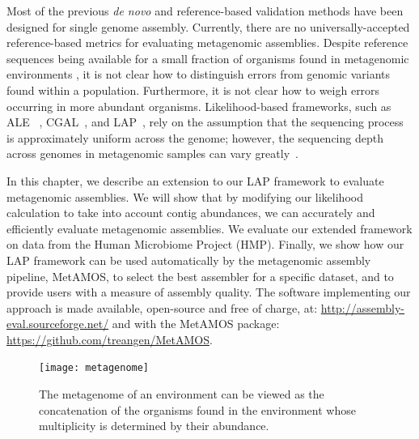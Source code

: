 \documentclass[12pt,\mydriver]{thesis}
\begin{document}
Most of the previous \emph{de novo} and reference-based validation methods have been designed for single genome assembly.
Currently, there are no universally-accepted reference-based metrics for evaluating metagenomic assemblies.
Despite reference sequences being available for a small fraction of organisms found in metagenomic environments \cite{angly2006marine,dinsdale2008functional}, it is not clear how to distinguish errors from genomic variants found within a population.
Furthermore, it is not clear how to weigh errors occurring in more abundant organisms.
Likelihood-based frameworks, such as ALE ~\cite{clark2013ale}, CGAL~\cite{rahman2013cgal}, and LAP~\cite{LAP}, rely on the assumption that the sequencing process is approximately uniform across the genome; however, the sequencing depth across genomes in metagenomic samples can vary greatly~\cite{carrigg2007dna,krsek1999comparison,morgan2010metagenomic,temperton2009bias}.


In this chapter, we describe an extension to our LAP framework to evaluate metagenomic assemblies.
We will show that by modifying our likelihood calculation to take into account contig abundances, we can accurately and efficiently evaluate metagenomic assemblies.
We evaluate our extended framework on data from the Human Microbiome Project (HMP).
Finally, we show how our LAP framework can be used automatically by the metagenomic assembly pipeline, MetAMOS\cite{treangen2013metamos}, to select the best assembler for a specific dataset, and to provide users with a measure of assembly quality.
The software implementing our approach is made available, open-source and free of charge, at: \url{http://assembly-eval.sourceforge.net/} and with the MetAMOS package: \url{https://github.com/treangen/MetAMOS}.



\begin{figure}
\begin{center}
\texttt{[image: metagenome]}
\end{center}
\renewcommand{\baselinestretch}{1}
\small\normalsize
\begin{quote}
\caption[The metagenome of an environment]{The metagenome of an environment can be viewed as the concatenation of the organisms found in the environment whose multiplicity is determined by their abundance. \label{fig:metagenome}}
\end{quote}
\end{figure}
\renewcommand{\baselinestretch}{2}
\small\normalsize
\end{document}
